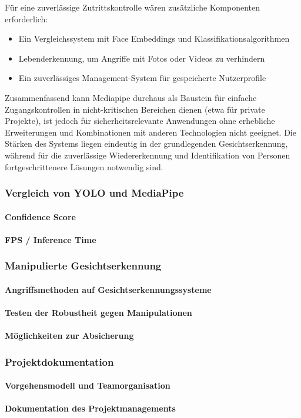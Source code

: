 Für eine zuverlässige Zutrittskontrolle wären zusätzliche Komponenten erforderlich:
\begin{itemize}
    \item Ein Vergleichssystem mit Face Embeddings und Klassifikationsalgorithmen
    \item Lebenderkennung, um Angriffe mit Fotos oder Videos zu verhindern
    \item Ein zuverlässiges Management-System für gespeicherte Nutzerprofile
\end{itemize}

Zusammenfassend kann Mediapipe durchaus als Baustein für einfache Zugangskontrollen in nicht-kritischen Bereichen dienen (etwa für private Projekte), ist jedoch für sicherheitsrelevante Anwendungen ohne erhebliche Erweiterungen und Kombinationen mit anderen Technologien nicht geeignet. 
Die Stärken des Systems liegen eindeutig in der grundlegenden Gesichtserkennung, während für die zuverlässige Wiedererkennung und Identifikation von Personen fortgeschrittenere Lösungen notwendig sind.

\subsubsection{Vergleich von YOLO und MediaPipe}
\paragraph{Confidence Score}
\paragraph{FPS / Inference Time}

\subsubsection{Manipulierte Gesichtserkennung}
\paragraph{Angriffsmethoden auf Gesichtserkennungssysteme}
\paragraph{Testen der Robustheit gegen Manipulationen}
\paragraph{Möglichkeiten zur Absicherung}

\subsubsection{Projektdokumentation}
\paragraph{Vorgehensmodell und Teamorganisation}
\paragraph{Dokumentation des Projektmanagements}